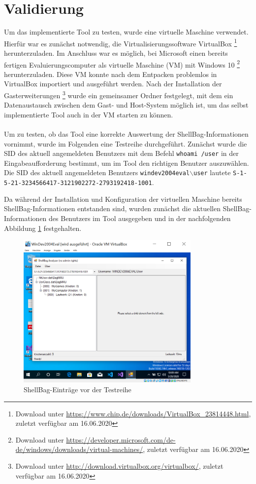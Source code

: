 \section{Validierung}
\vspace{0.5cm}
Um das implementierte Tool zu testen, wurde eine virtuelle Maschine verwendet. Hierfür war es zunächst notwendig, die Virtualisierungssoftware VirtualBox \footnote{Download unter \url{https://www.chip.de/downloads/VirtualBox_23814448.html}, zuletzt verfügbar am 16.06.2020}  herunterzuladen. Im Anschluss war es möglich, bei Microsoft einen bereits fertigen Evaluierungscomputer als virtuelle Maschine (VM) mit Windows 10 \footnote{Download unter \url{https://developer.microsoft.com/de-de/windows/downloads/virtual-machines/}, zuletzt verfügbar am 16.06.2020}  herunterzuladen. Diese VM konnte nach dem Entpacken problemlos in VirtualBox importiert und ausgeführt werden. Nach der Installation der Gasterweiterungen \footnote{Download unter \url{http://download.virtualbox.org/virtualbox/}, zuletzt verfügbar am 16.06.2020} wurde ein gemeinsamer Ordner festgelegt, mit dem ein Datenaustausch zwischen dem Gast- und Host-System möglich ist, um das selbst implementierte Tool auch in der VM starten zu können. \\
\\
Um zu testen, ob das Tool eine korrekte Auswertung der ShellBag-Informationen vornimmt, wurde im Folgenden eine Testreihe durchgeführt. Zunächst wurde die SID des aktuell angemeldeten Benutzers mit dem Befehl \glqq \texttt{whoami /user}\grqq{} in der Eingabeaufforderung bestimmt, um im Tool den richtigen Benutzer auszuwählen. Die SID des aktuell angemeldeten Benutzers \texttt{windev2004eval$\backslash$user} lautete \texttt{S-1-5-21-3234566417-3121902272-2793192418-1001}. 

Da während der Installation und Konfiguration der virtuellen Maschine bereits ShellBag-Informationen entstanden sind, wurden zunächst die aktuellen ShellBag-Informationen des Benutzers im Tool ausgegeben und in der nachfolgenden Abbildung \ref{img:vorher} festgehalten. 

\begin{figure}[H]
	\centering
	\includegraphics[width=0.8\textwidth]{part/vorher.png}
	\caption{ShellBag-Einträge vor der Testreihe} 
	\label{img:vorher}
\end{figure}

